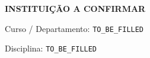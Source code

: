 %
%
%
%
%
%



\begin{frame}[plain]

    \begin{center}


        \vspace{0.5cm}



        {\large
        \textbf{INSTITUIÇÃO A CONFIRMAR}
        }

        \vspace{0.15cm}

        {\normalsize
        Curso / Departamento:
        \texttt{TO\_BE\_FILLED}
        }

        \vspace{0.15cm}

        {\normalsize
        Disciplina:
        \texttt{TO\_BE\_FILLED}
        }


        \vfill




\end{center}
\end{frame}
